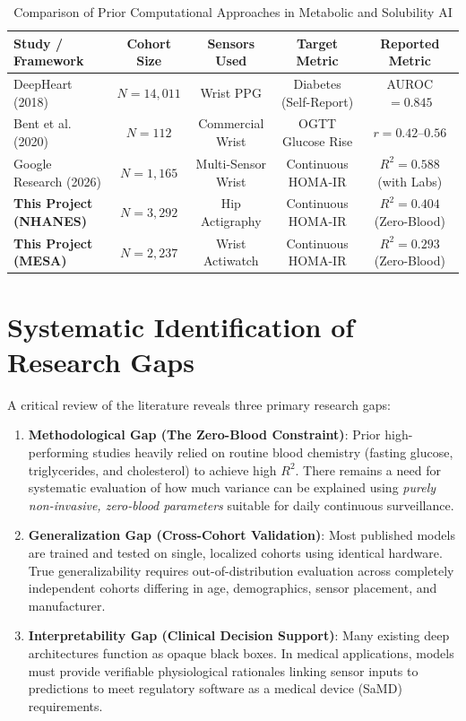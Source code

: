 \documentclass[12pt,a4paper,oneside]{report}
\begin{document}
\begin{table}[h!]
\centering
\small
\caption{Comparison of Prior Computational Approaches in Metabolic and Solubility AI}
\begin{tabularx}{\textwidth}{lcccc}
\toprule
\textbf{Study / Framework} & \textbf{Cohort Size} & \textbf{Sensors Used} & \textbf{Target Metric} & \textbf{Reported Metric} \\
\midrule
DeepHeart (2018) & $N = 14,011$ & Wrist PPG & Diabetes (Self-Report) & AUROC $= 0.845$ \\
Bent et al. (2020) & $N = 112$ & Commercial Wrist & OGTT Glucose Rise & $r = 0.42\text{--}0.56$ \\
Google Research (2026) & $N = 1,165$ & Multi-Sensor Wrist & Continuous HOMA-IR & $R^2 = 0.588$ (with Labs) \\
\textbf{This Project (NHANES)} & $N = 3,292$ & Hip Actigraphy & Continuous HOMA-IR & $R^2 = 0.404$ (Zero-Blood) \\
\textbf{This Project (MESA)} & $N = 2,237$ & Wrist Actiwatch & Continuous HOMA-IR & $R^2 = 0.293$ (Zero-Blood) \\
\bottomrule
\end{tabularx}
\label{tab:literature_comparison}
\end{table}

\section{Systematic Identification of Research Gaps}
A critical review of the literature reveals three primary research gaps:
\begin{enumerate}
    \item \textbf{Methodological Gap (The Zero-Blood Constraint)}: Prior high-performing studies heavily relied on routine blood chemistry (fasting glucose, triglycerides, and cholesterol) to achieve high $R^2$. There remains a need for systematic evaluation of how much variance can be explained using \textit{purely non-invasive, zero-blood parameters} suitable for daily continuous surveillance.
    \item \textbf{Generalization Gap (Cross-Cohort Validation)}: Most published models are trained and tested on single, localized cohorts using identical hardware. True generalizability requires out-of-distribution evaluation across completely independent cohorts differing in age, demographics, sensor placement, and manufacturer.
    \item \textbf{Interpretability Gap (Clinical Decision Support)}: Many existing deep architectures function as opaque black boxes. In medical applications, models must provide verifiable physiological rationales linking sensor inputs to predictions to meet regulatory software as a medical device (SaMD) requirements.
\end{enumerate}
\end{document}
